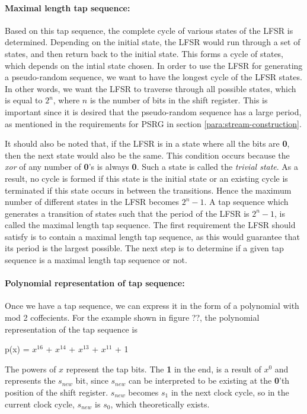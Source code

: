 \paragraph{Maximal length tap sequence:} Based on this tap sequence, the complete cycle of various states of the LFSR is determined. Depending on the initial state, the LFSR would run through a set of states, and then return back to the initial state. This forms a cycle of states, which depends on the intial state chosen. In order to use the LFSR for generating a pseudo-random sequence, we want to have the longest cycle of the LFSR states. In other words, we want the LFSR to traverse through all possible states, which is equal to $2^n$, where $n$ is the number of bits in the shift register. This is important since it is desired that the pseudo-random sequence has a large period, as mentioned in the requirements for PSRG in section \ref{para:stream-construction}.

It should also be noted that, if the LFSR is in a state where all the bits are \textbf{0}, then the next state would also be the same. This condition occurs because the \textit{xor} of any number of \textbf{0}'s is always \textbf{0}. Such a state is called the \textit{trivial state}. As a result, no cycle is formed if this state is the initial state or an existing cycle is terminated if this state occurs in between the transitions. Hence the maximum number of different states in the LFSR becomes $2^n-1$. A tap sequence which generates a transition of states such that the period of the LFSR is $2^n-1$, is called the maximal length tap sequence. The first requirement the LFSR should satisfy is to contain a maximal length tap sequence, as this would guarantee that its period is the largest possible. The next step is to determine if a given tap sequence is a maximal length tap sequence or not. 

\paragraph{Polynomial representation of tap sequence:} Once we have a tap sequence, we can express it in the form of a polynomial with mod 2 coffecients. For the example shown in figure ??, the polynomial representation of the tap sequence is

\begin{center}
p(x) = $x^{16}$ + $x^{14}$ + $x^{13}$ + $x^{11}$ + 1
\end{center}

The powers of $x$ represent the tap bits. The \textbf{1} in the end, is a result of $x^0$ and represents the $s_{new}$ bit, since $s_{new}$ can be interpreted to be existing at the \textbf{0}'th position of the shift register. $s_{new}$ becomes $s_1$ in the next clock cycle, so in the current clock cycle, $s_{new}$ is $s_0$, which theoretically exists.

